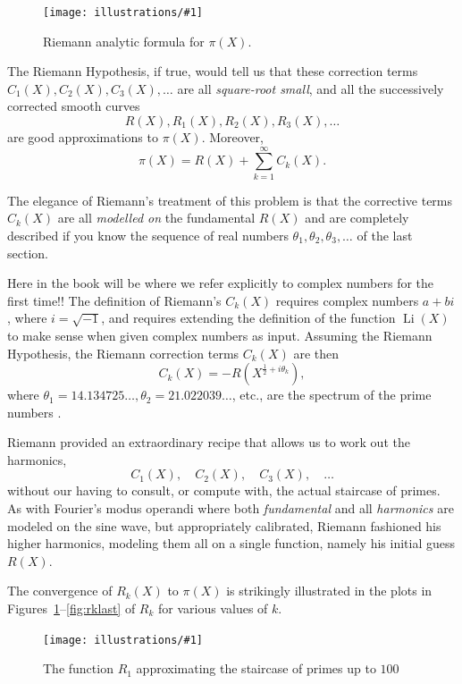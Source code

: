 \documentclass[openany]{book}
\DeclareMathOperator{\Li}{Li}
\newcommand{\ill}[3]{%
   \begin{figure}[H]%
   \vspace{-2ex}
   \centering%
   \texttt{[image: illustrations/\#1]}%
   \caption{#3}%
   \vspace{-2ex}
    \end{figure}}
\theoremstyle{plain}
\theoremstyle{definition}
\newcommand{\RH}{Riemann Hypothesis\index{Riemann Hypothesis}}
\begin{document}
{{\ill{riemann_Rk}{0.8}{Riemann analytic formula for $\pi(X)$.}

The \RH{}, if true, would tell us that these correction
terms $C_1(X), C_2(X), C_3(X),\dots$ are all {\em square-root small},
and all the successively corrected smooth curves $$R(X), R_1(X),
R_2(X),R_3(X),\dots$$ are good approximations to $\pi(X)$.
Moreover,
$$
 \pi(X) = R(X) + \sum_{k=1}^{\infty} C_k(X).
$$

The elegance of Riemann's treatment of this problem is that the
corrective terms $C_k(X)$ are all {\em modelled on} the fundamental
$R(X)$ and are completely described if you know the sequence of real
numbers $\theta_1, \theta_2, \theta_3,\dots$ of the last section.


Here in the book will be where we refer explicitly to complex numbers
for the first time!!  The definition of Riemann's $C_k(X)$ requires
complex numbers $a+bi$, where $i=\sqrt{-1}$, and requires extending
the definition of the function $\Li(X)$ to make sense when given
complex numbers as input.  Assuming the \RH{}, the Riemann correction
terms $C_k(X)$ are then
$$
   C_k(X)= -R(X^{\frac{1}{2} + i\theta_k}),
$$
where $\theta_1 = 14.134725\dots, \theta_2 = 21.022039\dots$, etc.,
are the spectrum of the prime numbers .

Riemann provided an extraordinary recipe that allows us to work
out the harmonics, $$C_1(X),\quad C_2(X),\quad C_3(X),\quad \dots$$ without our having
to consult, or compute with, the actual staircase of primes. As with
Fourier's modus operandi where both {\em fundamental} and all {\em
  harmonics} are modeled on the sine wave, but appropriately
calibrated, Riemann fashioned his higher harmonics, modeling them all
on a single function, namely his initial guess $R(X)$.

The convergence of $R_k(X)$ to $\pi(X)$ is strikingly illustrated
in the plots in Figures~\ref{fig:rkfirst}--\ref{fig:rklast} of $R_k$ for various values of $k$.


\ill{Rk_1_2_100}{.9}{The function $R_{1}$ approximating the staircase of primes up to $100$\label{fig:rkfirst}}

}}
\end{document}
